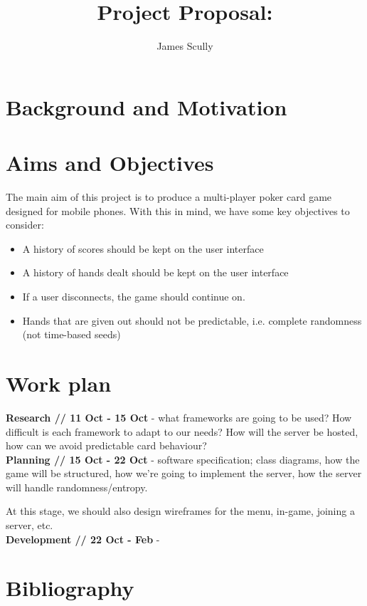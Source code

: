 \documentclass[11pt]{article}
\title{Project Proposal: \pt}
\author{James Scully}
\begin{document}
\maketitle

\section*{Background and Motivation}




\newpage
\section*{Aims and Objectives}
The main aim of this project is to produce a multi-player poker card game designed for mobile phones. 
With this in mind, we have some key objectives to consider: 

\begin{itemize}
	\item A history of scores should be kept on the user interface
	\item A history of hands dealt should be kept on the user interface
	\item If a user disconnects, the game should continue on.
	\item Hands that are given out should not be predictable, i.e. complete randomness (not time-based seeds)
	
\end{itemize}

\newpage
\section*{Work plan}


\textbf{Research // 11 Oct - 15 Oct} - what frameworks are going to be used? How difficult is each framework to adapt to our needs? How will the server be hosted, how can we avoid predictable card behaviour?\\


\textbf{Planning // 15 Oct - 22 Oct } - software specification; class diagrams, how the game will be structured, how we're going to implement the server, how the server will handle randomness/entropy.

At this stage, we should also design wireframes for the menu, in-game, joining a server, etc. \\


\textbf{Development // 22 Oct - Feb } - 




\newpage
\section*{Bibliography}
\end{document}
